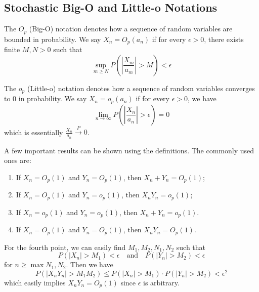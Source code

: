 \documentclass{article}
\begin{document}
\subsection{Stochastic Big-O and Little-o Notations}
\begin{definition}
    The $O_p$ (Big-O) notation denotes how a sequence of random variables are bounded in probability. We say $X_n = O_p(a_n)$ if for every $\epsilon > 0$, there exists finite $M, N > 0$ such that
    \begin{equation}
        \sup_{m \geq N} P\left( \left|\frac{X_m}{a_m}\right| > M \right) < \epsilon
    \end{equation}
\end{definition}
\begin{definition}
    The $o_p$ (Little-o) notation denotes how a sequence of random variables converges to 0 in probability. We say $X_n = o_p(a_n)$ if for every $\epsilon > 0$, we have
    \begin{equation}
        \lim_{n \to \infty}P\left( \left|\frac{X_n}{a_n}\right| > \epsilon \right) = 0
    \end{equation}
    which is essentially $\frac{X_n}{a_n} \xrightarrow{P} 0$.
\end{definition}
A few important results can be shown using the definitions. The commonly used ones are:
\begin{enumerate}
    \item If $X_n = O_p(1)$ and $Y_n = O_p(1)$, then $X_n + Y_n = O_p(1)$;
    \item If $X_n = O_p(1)$ and $Y_n = o_p(1)$, then $X_nY_n = o_p(1)$;
    \item If $X_n = o_p(1)$ and $Y_n = o_p(1)$, then $X_n + Y_n = o_p(1)$.
    \item If $X_n = O_p(1)$ and $Y_n = O_p(1)$, then $X_nY_n = O_p(1)$.
\end{enumerate}
For the fourth point, we can easily find $M_1, M_2, N_1, N_2$ such that
\begin{equation}
    P\left( \left|X_n\right| > M_1 \right) < \epsilon \quad \text{and} \quad P\left( \left|Y_n\right| > M_2 \right) < \epsilon
\end{equation}
for $n \geq \max{N_1, N_2}$. Then we have
\begin{equation}
    P\left( \left|X_nY_n\right| > M_1M_2 \right) \leq P\left( \left|X_n\right| > M_1 \right) \cdot P\left( \left|Y_n\right| > M_2 \right) < \epsilon^2
\end{equation}
which easily implies $X_nY_n = O_p(1)$ since $\epsilon$ is arbitrary.
\newpage
\setcounter{section}{5}
\end{document}
